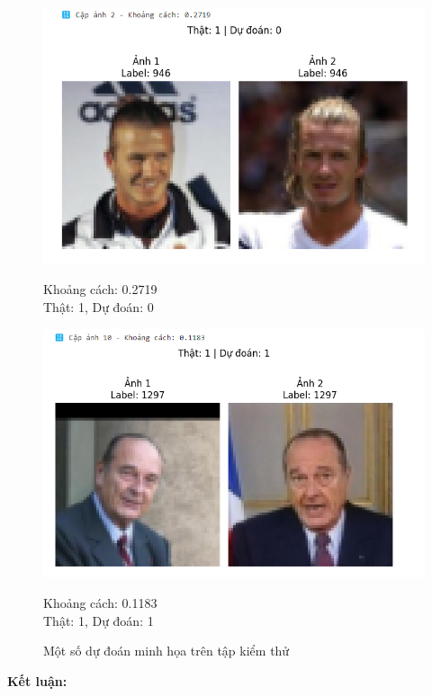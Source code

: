 {\begin{figure}[H]
    \begin{minipage}[b]{0.48\textwidth}
        \centering
        \includegraphics[width=\linewidth]{img/05-3.png}
        \caption*{Khoảng cách: 0.2719\\Thật: 1, Dự đoán: 0}
    \end{minipage}
    \hfill
    \begin{minipage}[b]{0.48\textwidth}
        \centering
        \includegraphics[width=\linewidth]{img/05-4.png}
        \caption*{Khoảng cách: 0.1183\\Thật: 1, Dự đoán: 1}
    \end{minipage}
    
    \caption{Một số dự đoán minh họa trên tập kiểm thử}
    \label{fig:comparison}
\end{figure}

\vspace{1em}
\noindent
\textbf{Kết luận:}  

}
